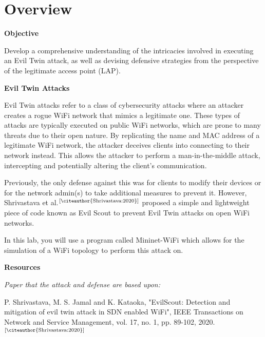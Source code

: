 \documentclass[letterpaper,12pt]{report}
\begin{document}
\clearpage
{}
\settableofcontents
\tableofcontents
\clearpage

\newpage
\section*{Overview}\label{sec:work-carried-out}

\textbf{Objective}

Develop a comprehensive understanding of the intricacies involved in executing an Evil Twin attack, as well as devising defensive strategies from the perspective of the legitimate access point (LAP).

\textbf{Evil Twin Attacks}

Evil Twin attacks refer to a class of cybersecurity attacks where an attacker creates a rogue WiFi network that mimics a legitimate one. These types of attacks are typically executed on public WiFi networks, which are prone to many threats due to their open nature. By replicating the name and MAC address of a legitimate WiFi network, the attacker deceives clients into connecting to their network instead. This allows the attacker to perform a man-in-the-middle attack, intercepting and potentially altering the client's communication.

Previously, the only defense against this was for clients to modify their devices or for the network admin(s) to take additional measures to prevent it. However, Shrivastava et al.$^\text{[\citeauthor{Shrivastava:2020}]}$ proposed a simple and lightweight piece of code known as Evil Scout to prevent Evil Twin attacks on open WiFi networks.

In this lab, you will use a program called Mininet-WiFi which allows for the simulation of a WiFi topology to perform this attack on.

\textbf{Resources}

\textit{Paper that the attack and defense are based upon:}

P. Shrivastava, M. S. Jamal and K. Kataoka, "EvilScout: Detection and mitigation of evil twin attack in SDN enabled WiFi", IEEE Transactions on Network and Service Management, vol. 17, no. 1, pp. 89-102, 2020.$^\text{[\citeauthor{Shrivastava:2020}]}$

\end{document}
